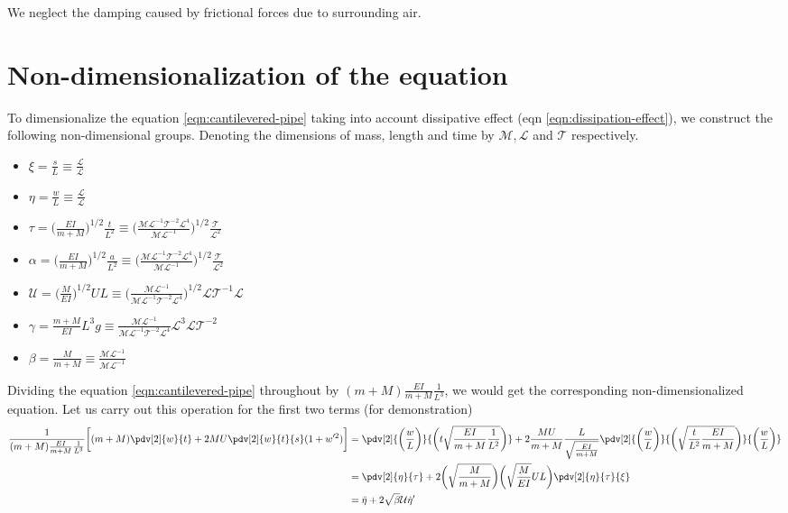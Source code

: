 We neglect the damping caused by frictional forces due to surrounding air.

\section{Non-dimensionalization of the equation}
To dimensionalize the equation \ref{eqn:cantilevered-pipe} taking into account dissipative effect (eqn \ref{eqn:dissipation-effect}), we construct the following non-dimensional groups. Denoting the dimensions of mass, length and time by $\mathcal{M}, \mathcal{L}$ and $\mathcal{T}$ respectively.

\begin{itemize}
	\item $\xi = \frac{s}{L} \equiv \frac{\mathcal{L}}{\mathcal{L}}$
	\item $\eta = \frac{w}{L} \equiv \frac{\mathcal{L}}{\mathcal{L}}$ 
	\item $\tau = \bigg(\frac{EI}{m + M}\bigg)^{1/2}\frac{t}{L^2} \equiv \bigg(\frac{\mathcal{M}\mathcal{L}^{-1}\mathcal{T}^{-2}\mathcal{L}^4}{\mathcal{M}\mathcal{L}^{-1}}\bigg)^{1/2}\frac{\mathcal{T}}{\mathcal{L}^2}$
	\item $\alpha = \bigg(\frac{EI}{m + M}\bigg)^{1/2}\frac{a}{L^2} \equiv \bigg(\frac{\mathcal{M}\mathcal{L}^{-1}\mathcal{T}^{-2}\mathcal{L}^4}{\mathcal{M}\mathcal{L}^{-1}}\bigg)^{1/2}\frac{\mathcal{T}}{\mathcal{L}^2}$ 
	\item $\mathcal{U} = \bigg(\frac{M}{EI}\bigg)^{1/2}UL \equiv \big(\frac{\mathcal{M}\mathcal{L}^{-1}}{\mathcal{M}\mathcal{L}^{-1}\mathcal{T}^{-2}\mathcal{L}^4}\big)^{1/2} \mathcal{L}\mathcal{T}^{-1}\mathcal{L}$
	\item $\gamma = \frac{m + M}{EI}L^3g \equiv \frac{\mathcal{M}\mathcal{L}^{-1}}{\mathcal{M}\mathcal{L}^{-1}\mathcal{T}^{-2}\mathcal{L}^4}\mathcal{L}^3\mathcal{L}\mathcal{T}^{-2}$
	\item $\beta = \frac{M}{m + M} \equiv \frac{\mathcal{M}\mathcal{L}^{-1}}{\mathcal{M}\mathcal{L}^{-1}}$
\end{itemize}
Dividing the equation \ref{eqn:cantilevered-pipe} throughout by $(m+M)\frac{EI}{m + M}\frac{1}{L^3}$, we would get the corresponding non-dimensionalized equation. Let us carry out this operation for the first two terms (for demonstration)
\begin{align*}
  \frac{1}{(m+M)\frac{EI}{m + M}\frac{1}{L^3}}\bigg[(m + M) \pdv[2]{w}{t} + 2MU \pdv[2]{w}{t}{s} (1 + w'^2)\bigg] &= \pdv[2]{\bigg(\frac{w}{L}\bigg)}{\bigg(t\sqrt{\frac{EI}{m + M}\frac{1}{L^2}}\bigg)} + 2 \frac{MU}{m + M}\frac{L}{\sqrt{\frac{EI}{m+M}}}\pdv[2]{\bigg(\frac{w}{L}\bigg)}{\bigg(\sqrt{\frac{t}{L^2}\frac{EI}{m + M}}\bigg)}{\bigg(\frac{w}{L}\bigg)} \\
  &= \pdv[2]{\eta}{\tau} + 2\bigg(\sqrt{\frac{M}{m+M}}\bigg)\bigg(\sqrt{\frac{M}{EI}}UL\bigg) \pdv[2]{\eta}{\tau}{\xi} \\
  &= \ddot{\eta} + 2\sqrt{\beta}\mathcal{U}\dot{\eta}'
\end{align*}
